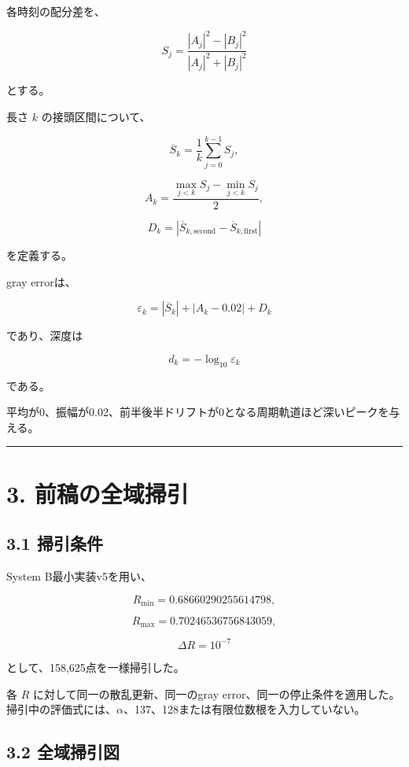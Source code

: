 \documentclass[
  10pt,
  a4paper,
]{article}
\begin{document}
各時刻の配分差を、

\[
S_j=
\frac{|A_j|^2-|B_j|^2}
{|A_j|^2+|B_j|^2}
\]

とする。

長さ \(k\) の接頭区間について、

\[
\overline S_k
=\frac1k\sum_{j=0}^{k-1}S_j,
\]

\[
A_k
=\frac{\max_{j<k}S_j-\min_{j<k}S_j}{2},
\]

\[
D_k
=\left|
\overline S_{k,\mathrm{second}}
-\overline S_{k,\mathrm{first}}
\right|
\]

を定義する。

gray errorは、

\[
\varepsilon_k
=|\overline S_k|
+|A_k-0.02|
+D_k
\]

であり、深度は

\[
\boxed{
d_k=-\log_{10}\varepsilon_k
}
\]

である。

平均が0、振幅が0.02、前半後半ドリフトが0となる周期軌道ほど深いピークを与える。

\begin{center}\rule{0.5\linewidth}{0.5pt}\end{center}

\section{3.
前稿の全域掃引}\label{ux524dux7a3fux306eux5168ux57dfux6383ux5f15}

\subsection{3.1 掃引条件}\label{ux6383ux5f15ux6761ux4ef6}

System B最小実装v5を用い、

\[
R_{\min}=0.68660290255614798,
\]

\[
R_{\max}=0.70246536756843059,
\]

\[
\Delta R=10^{-7}
\]

として、158,625点を一様掃引した。

各 \(R\) に対して同一の散乱更新、同一のgray
error、同一の停止条件を適用した。掃引中の評価式には、\(\alpha\)、137、128または有限位数根を入力していない。

\subsection{3.2 全域掃引図}\label{ux5168ux57dfux6383ux5f15ux56f3}
\end{document}
